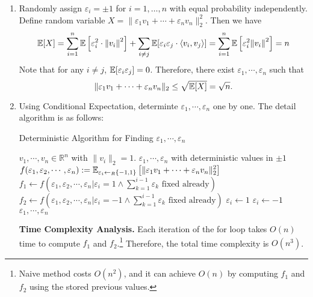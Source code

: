 \begin{answer}
    \begin{enumerate}[label=\alph*).]
        \item Randomly assign $\varepsilon_i = \pm 1$ for $i=1,\dots,n$ with equal probability independently. 
        Define random variable $X = \|\varepsilon_1 v_1 + \cdots + \varepsilon_n v_n\|_2^2$. 
        Then we have 
        \begin{align*}
            \mathbb{E}[X] = \sum_{i=1}^{n} \mathbb{E}\left[\varepsilon_i^2 \cdot \norm{v_i}^2\right] + \sum_{i \neq j} \mathbb{E}[\varepsilon_i \varepsilon_j \cdot \langle v_i, v_j \rangle] = \sum_{i=1}^{n} \mathbb{E}\left[\varepsilon_i^2 \norm{v_i}^2\right] = n 
        \end{align*}
        Note that for any $i\neq j$, $\mathbb{E}[\varepsilon_i \varepsilon_j] = 0$. Therefore, there exist $\varepsilon_1, \cdots, \varepsilon_n$ such that
        \[
            \|\varepsilon_1 v_1 + \cdots + \varepsilon_n v_n\|_2 \leq \sqrt{\mathbb{E}[X]} = \sqrt{n}.
        \]
        \item Using Conditional Expectation, determinte $\varepsilon_1, \cdots, \varepsilon_n$ one by one. 
        The detail algorithm is as follows:
        \begin{algo}
            \centering
            \caption{Deterministic Algorithm for Finding $\varepsilon_1, \cdots, \varepsilon_n$}
            \label{alg:deterministic}
            \begin{algorithmic}[1]
                \Require $v_1, \cdots, v_n \in \mathbb R^n$ with $\|v_i\|_2= 1$.
                \Ensure $\varepsilon_1, \cdots, \varepsilon_n$ with deterministic values in $\pm 1$ 
                \State $\displaystyle f(\varepsilon_1, \varepsilon_2, \cdots, \varepsilon_n) := \mathbb{E}_{\varepsilon_i \leftarrow_R \{-1, 1\}}\left[\|\varepsilon_1 v_1 + \cdots + \varepsilon_n v_n\|_2^2\right]$
                    \State $f_1 \leftarrow f\left(\varepsilon_1, \varepsilon_2, \cdots, \varepsilon_n \big| \varepsilon_i=1 \land \sum_{k=1}^{i-1} \varepsilon_k \text{ fixed already}\right)$ 
                    \State $f_2 \leftarrow f\left(\varepsilon_1, \varepsilon_2, \cdots, \varepsilon_n \big| \varepsilon_i=-1 \land \sum_{k=1}^{i-1} \varepsilon_k \text{ fixed already}\right)$
                        \State $\varepsilon_i \leftarrow 1$
                    \Else
                        \State $\varepsilon_i \leftarrow -1$
                    \EndIf
                \EndFor
                \State \Return $\varepsilon_1, \cdots, \varepsilon_n$
            \end{algorithmic}
        \end{algo}
        \textbf{Time Complexity Analysis.} Each iteration of the for loop takes $O(n)$ time to compute $f_1$ and $f_2$.\footnote{Naive method costs $O(n^2)$, and it can achieve $O(n)$ by computing $f_1$ and $f_2$ using the stored previous values.}
        Therefore, the total time complexity is $O(n^3)$.


\end{enumerate}
\end{answer}
